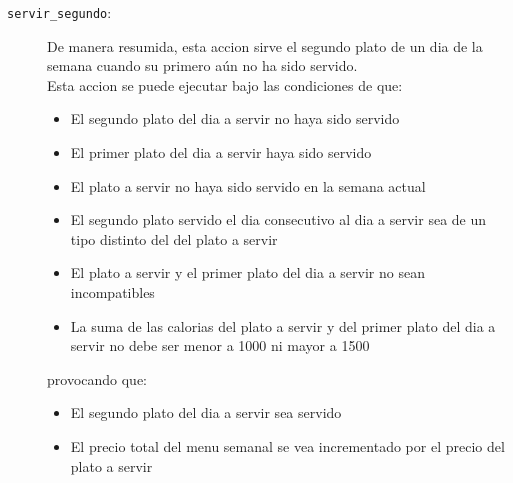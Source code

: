 \begin{description}
  \item[\texttt{servir\_segundo}:]

    De manera resumida, esta accion
    sirve el segundo plato de un dia de la semana cuando su primero
    aún no ha sido servido.
    \\

    Esta accion se puede ejecutar
    bajo las condiciones de que:
    \begin{itemize}
      \item El segundo plato del dia a servir no haya sido servido
      \item El primer plato del dia a servir haya sido servido
      \item El plato a servir no haya sido servido en la semana actual
      \item El segundo plato servido el dia consecutivo al dia a servir sea de
        un tipo distinto del del plato a servir
      \item El plato a servir y el primer plato del dia a servir no sean
        incompatibles
      \item La suma de las calorias del plato a servir y del primer plato
        del dia a servir no debe ser menor a 1000 ni mayor a 1500
    \end{itemize}
    provocando que:
    \begin{itemize}
      \item El segundo plato del dia a servir sea servido
      \item El precio total del menu semanal se vea incrementado por el precio 
        del plato a servir
    \end{itemize}

\end{description}
